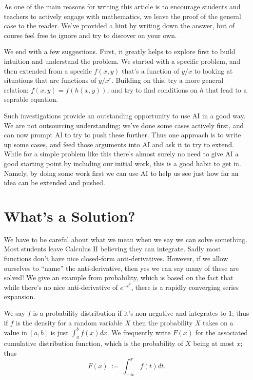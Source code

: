 \documentclass[12pt,reqno]{amsart}
\theoremstyle{plain}
\numberwithin{equation}{section} %
\numberwithin{table}{section} %
\numberwithin{figure}{section}
\begin{document}
As one of the main reasons for writing this article is to encourage students and teachers to actively engage with mathematics, we leave the proof of the general case to the reader. We've provided a hint by writing down the answer, but of course feel free to ignore and try to discover on your own.

We end with a few suggestions. First, it greatly helps to explore first to build intuition and understand the problem. We started with a specific problem, and then extended from a specific $f(x,y)$ that's a function of $y/x$ to looking at situations that are functions of $y/x^r$. Building on this, try a more general relation: $f(x,y) = f(h(x,y))$, and try to find conditions on $h$ that lead to a seprable equation.

Such investigations provide an outstanding opportunity to use AI in a good way. We are not outsourcing understanding; we've done some cases actively first, and can now prompt AI to try to push these further. Thus one approach is to write up some cases, and feed those arguments into AI and ask it to try to extend. While for a simple problem like this there's almost surely no need to give AI a good starting point by including our initial work, this is a good habit to get in. Namely, by doing some work first we can use AI to help us see just how far an idea can be extended and pushed.

\appendix
\section{What's a Solution?}\label{sec:appendixwhatsasoln}

We have to be careful about what we mean when we say we can solve something. Most students leave Calculus II believing they can integrate. Sadly most functions don't have nice closed-form anti-derivatives. However, if we allow ourselves to ``name'' the anti-derivative, then yes we can say many of these are solved! We give an example from probability, which is based on the fact that while there's no nice anti-derivative of $e^{-t^2}$, there is a rapidly converging series expansion.

We say $f$ is a probability distribution if it's non-negative and  integrates to 1; thus if $f$ is the density for a random variable $X$ then the probability $X$ takes on a value in $[a, b]$ is just $\int_a^b f(x) dx$.
We frequently write $F(x)$ for the associated cumulative distribution function, which is the probability of $X$ being at most $x$; thus $$F(x) \ := \ \int_{-\infty}^x f(t)dt.$$
\end{document}
